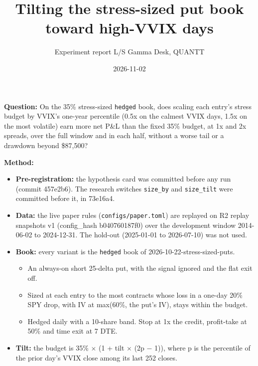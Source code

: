 \documentclass{article}
\title{Tilting the stress-sized put book toward high-VVIX days}
\author{Experiment report \textperiodcentered{} L/S Gamma Desk, QUANTT}
\date{2026-11-02}
\begin{document}
\maketitle

\textbf{Question:} On the 35\% stress-sized \texttt{hedged} book, does scaling each entry's stress budget by VVIX's one-year percentile (0.5x on the calmest VVIX days, 1.5x on the most volatile) earn more net P\&L than the fixed 35\% budget, at 1x and 2x spreads, over the full window and in each half, without a worse tail or a drawdown beyond \$87,500?

\textbf{Method:}

\begin{itemize}

\item \textbf{Pre-registration:} the hypothesis card was committed before any run (commit 457e2b6). The research switches \texttt{size\_\allowbreak{}by} and \texttt{size\_\allowbreak{}tilt} were committed before it, in 73e16a4.

\item \textbf{Data:} the live paper rules (\texttt{configs/\allowbreak{}paper.\allowbreak{}toml}) are replayed on R2 replay snapshots v1 (config\_hash b040760187f0) over the development window 2014-06-02 to 2024-12-31. The hold-out (2025-01-01 to 2026-07-10) was not used.

\item \textbf{Book:} every variant is the \texttt{hedged} book of 2026-10-22-stress-sized-puts.

\begin{itemize}

\item An always-on short 25-delta put, with the signal ignored and the flat exit off.

\item Sized at each entry to the most contracts whose loss in a one-day 20\% SPY drop, with IV at max(60\%, the put's IV), stays within the budget.

\item Hedged daily with a 10-share band. Stop at 1x the credit, profit-take at 50\% and time exit at 7 DTE.

\end{itemize}

\item \textbf{Tilt:} the budget is 35\% \ensuremath{\times} (1 + tilt \ensuremath{\times} (2p \ensuremath{-} 1)), where p is the percentile of the prior day's VVIX close among its last 252 closes.


\end{itemize}
\end{document}
